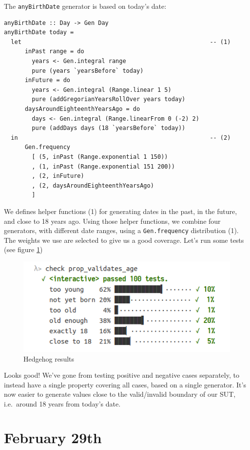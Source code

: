 The \texttt{anyBirthDate} generator is based on today's date:

\begin{verbatim}
anyBirthDate :: Day -> Gen Day
anyBirthDate today =
  let                                                      -- (1)
      inPast range = do   
        years <- Gen.integral range
        pure (years `yearsBefore` today)
      inFuture = do
        years <- Gen.integral (Range.linear 1 5)
        pure (addGregorianYearsRollOver years today)
      daysAroundEighteenthYearsAgo = do
        days <- Gen.integral (Range.linearFrom 0 (-2) 2)
        pure (addDays days (18 `yearsBefore` today))
  in                                                       -- (2)
      Gen.frequency
        [ (5, inPast (Range.exponential 1 150))
        , (1, inPast (Range.exponential 151 200))
        , (2, inFuture)
        , (2, daysAroundEighteenthYearsAgo)
        ]
\end{verbatim}
We defines helper functions (1) for generating dates in the past, in the
future, and close to 18 years ago. Using those helper functions, we
combine four generators, with different date ranges, using a
\texttt{Gen.frequency} distribution (1). The weights we use are selected
to give us a good coverage.
Let's run some tests (see figure \ref{fig:hedgehog5})
\begin{figure}[htbp]
 \centering
 \includegraphics[width=.95\linewidth]{./pics/hedgehog5.png}
 \caption{Hedgehog results}
 \label{fig:hedgehog5}
\end{figure}

\noindent Looks good! We've gone from testing positive and negative cases
separately, to instead have a single property covering all cases, based
on a single generator. It's now easier to generate values close to the
valid/invalid boundary of our SUT, i.e.~around 18 years from today's
date.

\section{February 29th}
\label{february-29th}

